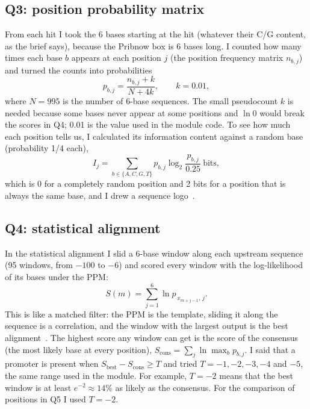 \documentclass[11pt,a4paper]{article}
\begin{document}
\subsection{Q3: position probability matrix}
From each hit I took the 6 bases starting at the hit (whatever their C/G content, as the brief
says), because the Pribnow box is 6 bases long. I counted how many times each base $b$ appears at
each position $j$ (the position frequency matrix $n_{b,j}$) and turned the counts into probabilities
\begin{equation}
p_{b,j}=\frac{n_{b,j}+k}{N+4k},\qquad k=0.01,
\label{eq:ppm}
\end{equation}
where $N=995$ is the number of 6-base sequences. The small pseudocount $k$ is needed because some
bases never appear at some positions and $\ln 0$ would break the scores in Q4; 0.01 is the value used
in the module code. To see how much each position tells us, I calculated its information content
against a random base (probability 1/4 each),
\begin{equation}
I_j=\sum_{b\in\{A,C,G,T\}} p_{b,j}\log_2\frac{p_{b,j}}{0.25}\ \text{bits},
\label{eq:ic}
\end{equation}
which is 0 for a completely random position and 2 bits for a position that is always the same base,
and I drew a sequence logo~\cite{logo}.

\subsection{Q4: statistical alignment}
In the statistical alignment I slid a 6-base window along each upstream sequence (95 windows, from
$-100$ to $-6$) and scored every window with the log-likelihood of its bases under the PPM:
\begin{equation}
S(m)=\sum_{j=1}^{6}\ln p_{\,x_{m+j-1},\,j}.
\label{eq:score}
\end{equation}
This is like a matched filter: the PPM is the template, sliding it along the sequence is a
correlation, and the window with the largest output is the best alignment~\cite{stormo}. The highest
score any window can get is the score of the consensus (the most likely base at every position),
$S_{\text{cons}}=\sum_j \ln\max_b p_{b,j}$. I said that a promoter is present when
$S_{\text{best}}-S_{\text{cons}}\geq T$ and tried $T=-1,-2,-3,-4$ and $-5$, the same range used in
the module. For example, $T=-2$ means that the best window is at least $e^{-2}\approx 14\%$ as likely
as the consensus. For the comparison of positions in Q5 I used $T=-2$.
\end{document}
